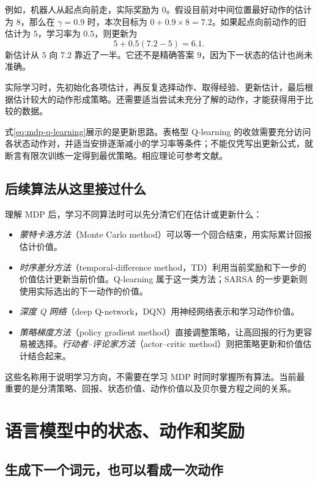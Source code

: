 \documentclass[UTF8,12pt,a4paper,fontset=fandol]{ctexart}
\begin{document}
例如，机器人从起点向前走，实际奖励为 $0$。假设目前对中间位置最好动作的估计为 $8$，那么在 $\gamma=0.9$ 时，本次目标为 $0+0.9\times8=7.2$。如果起点向前动作的旧估计为 $5$，学习率为 $0.5$，则更新为
\[
  5+0.5(7.2-5)=6.1.
\]
新估计从 $5$ 向 $7.2$ 靠近了一半。它还不是精确答案 $9$，因为下一状态的估计也尚未准确。

实际学习时，先初始化各项估计，再反复选择动作、取得经验、更新估计，最后根据估计较大的动作形成策略。还需要适当尝试未充分了解的动作，才能获得用于比较的数据。

式\eqref{eq:mdp-q-learning}展示的是更新思路。表格型 Q-learning 的收敛需要充分访问各状态动作对，并适当安排逐渐减小的学习率等条件；不能仅凭写出更新公式，就断言有限次训练一定得到最优策略。相应理论可参考文献\cite{watkins-dayan}。

\subsection{后续算法从这里接过什么}

理解 MDP 后，学习不同算法时可以先分清它们在估计或更新什么：
\begin{itemize}
  \item \emph{蒙特卡洛方法}（Monte Carlo method）可以等一个回合结束，用实际累计回报估计价值。
  \item \emph{时序差分方法}（temporal-difference method，TD）利用当前奖励和下一步的价值估计更新当前价值。Q-learning 属于这一类方法；SARSA 的一步更新则使用实际选出的下一动作的价值。
  \item \emph{深度 Q 网络}（deep Q-network，DQN）用神经网络表示和学习动作价值。
  \item \emph{策略梯度方法}（policy gradient method）直接调整策略，让高回报的行为更容易被选择。\emph{行动者--评论家方法}（actor--critic method）则把策略更新和价值估计结合起来。
\end{itemize}

这些名称用于说明学习方向，不需要在学习 MDP 时同时掌握所有算法。当前最重要的是分清策略、回报、状态价值、动作价值以及贝尔曼方程之间的关系。

\section{语言模型中的状态、动作和奖励}
\label{sec:mdp-llm}

\subsection{生成下一个词元，也可以看成一次动作}
\end{document}

